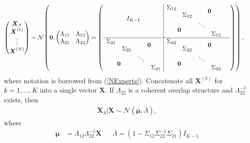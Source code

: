 \documentclass[11pt,twoside]{article}
\theoremstyle{definition}
\theoremstyle{definition}
\begin{document}
\begin{align*}
\left(\begin{matrix} \boldsymbol{X}_S \\ \boldsymbol{X}^{(1)}\\ \vdots \\ \boldsymbol{X}^{(N)} \end{matrix}\right) &\sim \mathcal{N}_{}\left( 
 \boldsymbol{0}, \left(\begin{matrix} 
\Lambda_{11} & \Lambda_{12}\\
\Lambda_{21} & \Lambda_{22}\\
 \end{matrix}\right) 
 =
 \left(\begin{array}{c c c c | c c c c c}
  \multicolumn{4}{c|}{\multirow{4}{*}{$I_{K-1}$}} & \Sigma_{12}  & &  \multicolumn{2}{c}{\multirow{2}{*}{$\boldsymbol{0}$}}   \\ 
 & &  & & &  \Sigma_{12} && & \\ 
   &  &  &  &  \multicolumn{2}{c}{\multirow{2}{*}{$\boldsymbol{0}$}}  & \ddots&  \\ 
   &  &  &  &&& &\Sigma_{12}  \\ \hline
\Sigma_{21} & &\multicolumn{2}{c|}{\multirow{2}{*}{$\boldsymbol{0}$}}& \Sigma_{22} & & \multicolumn{2}{c}{\multirow{2}{*}{$\boldsymbol{0}$}}   \\ 
 & \Sigma_{21} & & &  & \Sigma_{22} &&  \\ 
\multicolumn{2}{c}{\multirow{2}{*}{$\boldsymbol{0}$}}& \ddots &&\multicolumn{2}{c}{\multirow{2}{*}{$\boldsymbol{0}$}}  & \ddots &  \\ 
&&  & \Sigma_{21} &  &  &&\Sigma_{22} \\ 
 \end{array}\right)\right),
\end{align*}
where notation is borrowed from (\ref{NExperts}). Concatenate all $\boldsymbol{X}^{(k)}$ for $k = 1, \dots, K$ into a single vector  $\boldsymbol{X}$.  If $\Lambda_{22}$ is a coherent overlap structure and $\Lambda_{22}^{-1}$ exists, then 
\begin{align}
\boldsymbol{X}_{S} | \boldsymbol{X} \sim \mathcal{N}\left(\boldsymbol{\bar{\mu}}, \bar{\Lambda}\right), \label{CondMult}
\end{align}
where
\begin{align*}
\boldsymbol{\bar{\mu}} &=  \Lambda_{12} \Lambda_{22}^{-1} \boldsymbol{X} &&  \bar{\Lambda}= (1 - \Sigma_{12} \Sigma_{22}^{-1} \Sigma_{21}) I_{K-1}
\end{align*}
\end{document}
